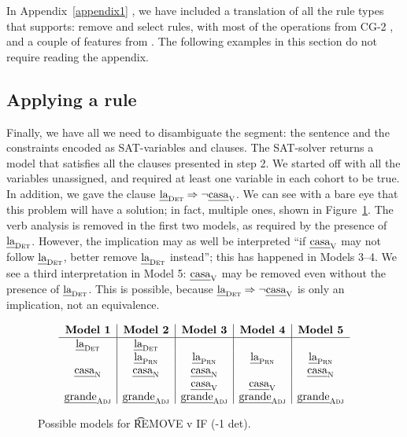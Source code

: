 In Appendix~\ref{appendix1}
, we have included a translation of all the rule types that \satcg{} supports: 
{\sc remove} and {\sc select} rules, with most of the operations from CG-2 \cite{tapanainen1996}, and a couple of features from  \cite{vislcg3}.
The following examples in this section do not require reading the appendix.

\subsection{Applying a rule}


Finally, we have all we need to disambiguate the segment: the sentence and the constraints encoded as SAT-variables and clauses. The SAT-solver returns a model that satisfies all the clauses presented in step 2.
We started off with all the variables unassigned, and required at least one variable 
in each cohort to be true. In addition, we gave the clause $\text{\em la}_{\text{\sc Det}} \Rightarrow \neg \text{\em casa}_{\text{\sc V}}$.
We can see with a bare eye that this problem will have a solution; in fact, multiple ones, 
shown in Figure~\ref{fig:modelsOneRule}.
The verb analysis is removed in the first two models, as required by the presence of $\text{\em la}_{\text{\sc Det}}$. However, the implication may as well be interpreted ``if $\text{\em casa}_{\text{\sc V}}$ may not follow $\text{\em la}_{\text{\sc Det}}$, better remove $\text{\em la}_{\text{\sc Det}}$ instead''; this has happened in Models 3--4. 
We see a third interpretation in Model 5: $\text{\em casa}_{\text{\sc V}}$ may be removed even without 
the presence of $\text{\em la}_{\text{\sc Det}}$. This is possible, because $\text{\em la}_{\text{\sc Det}} \Rightarrow \neg \text{\em casa}_{\text{\sc V}}$ is only an implication, not an equivalence.

\begin{figure}[h]
\centering
$$\begin{array}{ c | c | c | c | c}
\textbf{Model 1}  & \textbf{Model 2}  & \textbf{Model 3} & \textbf{Model 4} & \textbf{Model 5} \\ \hline
 \laDet   &  \laDet  &         &        &        \\
          &  \laPrn  & \laPrn  & \laPrn & \laPrn \\
 \casaN   &  \casaN  & \casaN  &        & \casaN \\
          &          & \casaV  & \casaV &         \\
\grandeAdj & \grandeAdj & \grandeAdj & \grandeAdj & \grandeAdj \\

\end{array}$$
\caption{Possible models for \t{REMOVE v IF (-1 det)}.}
\label{fig:modelsOneRule}
\end{figure}


